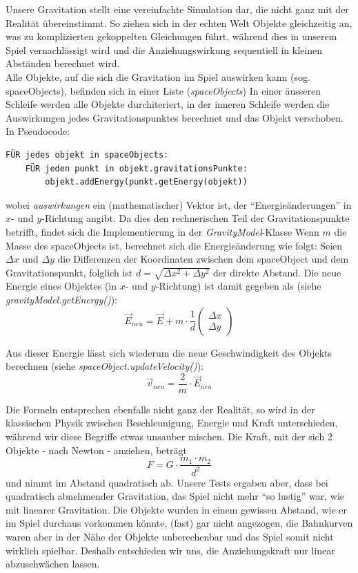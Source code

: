 \documentclass[12pt,a4paper]{scrartcl}
\newcommand{\q}[1]{``#1''}
\begin{document}
Unsere Gravitation stellt eine vereinfachte Simulation dar, die nicht ganz mit der Realität übereinstimmt.
So ziehen sich in der echten Welt Objekte gleichzeitig an, was zu komplizierten gekoppelten Gleichungen führt, während dies in
unserem Spiel vernachlässigt wird und die Anziehungswirkung sequentiell in kleinen Abständen berechnet wird.\\

Alle Objekte, auf die sich die Gravitation im Spiel auswirken kann (sog. spaceObjects), befinden sich in einer Liste (\textit{spaceObjects})
In einer äusseren Schleife werden alle Objekte durchiteriert, in der inneren Schleife werden die Auswirkungen jedes Gravitationspunktes berechnet und
das Objekt verschoben. In Pseudocode:
\begin{verbatim}
FÜR jedes objekt in spaceObjects:
    FÜR jeden punkt in objekt.gravitationsPunkte:
        objekt.addEnergy(punkt.getEnergy(objekt))
\end{verbatim}

wobei \textit{auswirkungen} ein (mathematischer) Vektor ist, der \q{Energieänderungen} in $x$- und $y$-Richtung angibt.
Da dies den rechnerischen Teil der Gravitationspunkte betrifft, findet sich die Implementierung in der \textit{GravityModel}-Klasse
Wenn $m$ die Masse des spaceObjects ist, berechnet sich die Energieänderung wie folgt:
Seien $\Delta x$ und $\Delta y$ die Differenzen der Koordinaten zwischen dem spaceObject und dem Gravitationspunkt,
folglich ist $d = \sqrt{\Delta x^2 + \Delta y^2}$ der direkte Abstand. Die neue Energie eines Objektes (in $x$- und $y$-Richtung)
ist damit gegeben als (siehe \textit{gravityModel.getEnergy()}): 
\[ \vec{E}_{neu} = \vec{E} + m \cdot \frac{1}{d} \begin{pmatrix}\Delta x \\ \Delta y\end{pmatrix} \]

Aus dieser Energie lässt sich wiederum die neue Geschwindigkeit des Objekts berechnen (siehe \textit{spaceObject.updateVelocity()}):
\[ \vec{v}_{neu} = \frac{2}{m} \cdot \vec{E}_{neu}\] 

Die Formeln entsprechen ebenfalls nicht ganz der Realität, so wird in der klassischen Physik zwischen Beschleunigung, Energie und Kraft unterschieden,
während wir diese Begriffe etwas unsauber mischen. Die Kraft, mit der sich 2 Objekte - nach Newton - anziehen, beträgt
\[ F = G \cdot \frac{m_1 \cdot m_2}{d^2} \]
und nimmt im Abstand quadratisch ab. Unsere Tests ergaben aber, dass bei quadratisch abnehmender Gravitation, das
Spiel nicht mehr \q{so lustig} war, wie mit linearer Gravitation. Die Objekte wurden in einem gewissen Abstand, wie er
im Spiel durchaus vorkommen könnte, (fast) gar nicht angezogen, die Bahnkurven waren aber in der Nähe der Objekte
unberechenbar und das Spiel somit nicht wirklich spielbar. Deshalb entschieden wir uns, die Anziehungskraft
nur linear abzuschwächen lassen.
\end{document}
